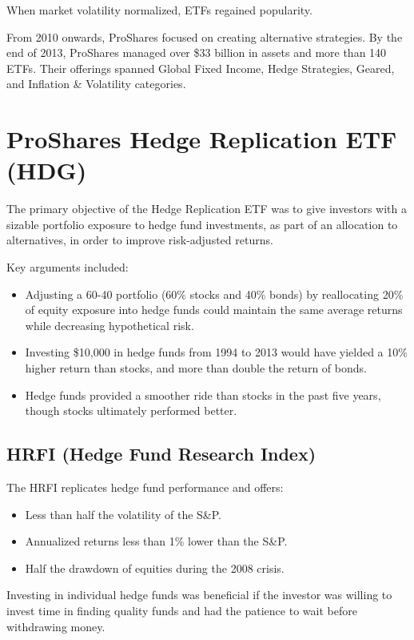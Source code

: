 \documentclass{article}
\begin{document}
When market volatility normalized, ETFs regained popularity.

From 2010 onwards, ProShares focused on creating alternative strategies. By the end of 2013, ProShares managed over \$33 billion in assets and more than 140 ETFs. Their offerings spanned Global Fixed Income, Hedge Strategies, Geared, and Inflation \& Volatility categories.

\section{ProShares Hedge Replication ETF (HDG)}
The primary objective of the Hedge Replication ETF was to give investors with a sizable portfolio exposure to hedge fund investments, as part of an allocation to alternatives, in order to improve risk-adjusted returns.

Key arguments included:
\begin{itemize}
    \item Adjusting a 60-40 portfolio (60\% stocks and 40\% bonds) by reallocating 20\% of equity exposure into hedge funds could maintain the same average returns while decreasing hypothetical risk.
    \item Investing \$10,000 in hedge funds from 1994 to 2013 would have yielded a 10\% higher return than stocks, and more than double the return of bonds.
    \item Hedge funds provided a smoother ride than stocks in the past five years, though stocks ultimately performed better.
\end{itemize}

\subsection{HRFI (Hedge Fund Research Index)}
The HRFI replicates hedge fund performance and offers:
\begin{itemize}
    \item Less than half the volatility of the S\&P.
    \item Annualized returns less than 1\% lower than the S\&P.
    \item Half the drawdown of equities during the 2008 crisis.
\end{itemize}

Investing in individual hedge funds was beneficial if the investor was willing to invest time in finding quality funds and had the patience to wait before withdrawing money.
\end{document}

